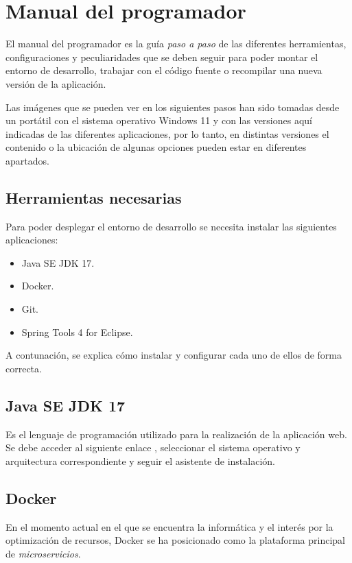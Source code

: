 \section{Manual del programador}

El manual del programador es la guía \textit{paso a paso} de las diferentes herramientas, configuraciones y peculiaridades que se deben seguir para poder montar el entorno de desarrollo, trabajar con el código fuente o recompilar una nueva versión de la aplicación.

Las imágenes que se pueden ver en los siguientes pasos han sido tomadas desde un portátil con el sistema operativo Windows 11 y con las versiones aquí indicadas de las diferentes aplicaciones, por lo tanto, en distintas versiones el contenido o la ubicación de algunas opciones pueden estar en diferentes apartados.

\subsection{Herramientas necesarias}

Para poder desplegar el entorno de desarrollo se necesita instalar las siguientes aplicaciones:

\begin{itemize}
	\item Java SE JDK 17.
	\item Docker.
	\item Git.
	\item Spring Tools 4 for Eclipse.
\end{itemize}

A contunación, se explica cómo instalar y configurar cada uno de ellos de forma correcta.

\subsection{Java SE JDK 17}

Es el lenguaje de programación utilizado para la realización de la aplicación web.
Se debe acceder al siguiente enlace \cite{web:JavaJDK}, seleccionar el sistema operativo y arquitectura correspondiente y seguir el asistente de instalación.

\subsection{Docker}

En el momento actual en el que se encuentra la informática y el interés por la optimización de recursos, Docker se ha posicionado como la plataforma principal de \textit{microservicios}.

